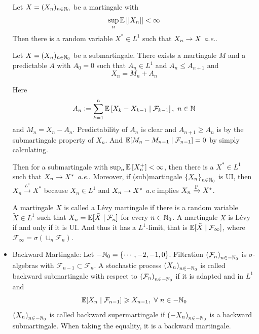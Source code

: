 \documentclass[a4paper,12pt]{article}
\begin{document}
\begin{itemize}
  \begin{thm}
    Let $X=(X_n)_{n\in \mathbb{N}_0}$ be a martingale with
    \begin{equation*}
      \sup_{n}\mathbb{E}\left[\left\lvert X_n\right\lvert\right] < \infty
    \end{equation*}
    Then there is a random variable $X^* \in L^1$ such that $X_n \rightarrow X$ \emph{a.e.}.
  \end{thm}

  \begin{prop}
    Let $X=(X_n)_{n\in \mathbb{N}_0}$ be a submartingale. There exists a martingale $M$ and a predictable $A$ with $A_0 = 0$ such that $A_n \in L^1$ and $A_n \leqslant A_{n+1}$ and
    \begin{equation*}
      X_n = M_n + A_n
    \end{equation*}
  \end{prop}
  Here
  \begin{equation*}
    A_n \vcentcolon= \sum_{k=1}^n\mathbb{E}\left[X_k - X_{k-1} \mid \mathcal{F}_{k-1}\right],~n\in \mathbb{N}
  \end{equation*}
  and $M_n = X_n - A_n$. Predictability of $A_n$ is clear and $A_{n+1} \geqslant A_n$ is by the submartingale property of $X_n$. And $\mathbb{E}[M_n - M_{n-1} \mid \mathcal{F}_{n-1}] = 0$ by simply calculating.

  \noindent Then for a submartingale with $\sup_{n}\mathbb{E}\left[X_n^+\right] < \infty$, then there is a $X^* \in L^1$ such that $X_n \rightarrow X^*$ \emph{a.e.}. Moreover, if (sub)martingale $\left\{{X}_n\right\}_{n\in \mathbb{N}_0}$ is UI, then $X_n \xrightarrow{L^1} X^*$ because $X_n \in L^1$ and $X_n \rightarrow X^*$ \emph{a.e} implies $X_n \xrightarrow{\mathbb{P}} X^*$. 

  \noindent A martingale $X$ is called a L\'evy martingale if there is a random variable $\tilde{X} \in L^1$ such that $X_n = \mathbb{E}[\tilde{X} \mid \mathcal{F}_n]$ for every $n \in \mathbb{N}_0$. A martingale $X$ is L\'evy if and only if it is UI. And thus it has a $L^1$-limit, that is $\mathbb{E}[\tilde{X} \mid \mathcal{F}_{\infty}]$, where $ \mathcal{F}_{\infty} = \sigma(\cup_n\mathcal{F}_n)$.

  \item Backward Martingale: Let $-\mathbb{N}_0 = \left\{\cdots,-2,-1,0\right\}$. Filtration $\left(\mathcal{F}_n\right)_{n\in -\mathbb{N}_0}$ is $\sigma$-algebras with $\mathcal{F}_{n-1} \subset \mathcal{F}_n$. A stochastic process $\left(X_n\right)_{n\in -\mathbb{N}_0}$ is called backward submartingale with respect to $\left(\mathcal{F}_n\right)_{n\in -\mathbb{N}_0}$ if it is adapted and in $L^1$ and
  \begin{equation*}
    \mathbb{E}[X_n \mid \mathcal{F}_{n-1}] \geqslant X_{n-1},~\forall~n\in -\mathbb{N}_0
  \end{equation*}
  $\left(X_n\right)_{n\in -\mathbb{N}_0}$ is called backward supermartingale if $\left(-X_n\right)_{n\in -\mathbb{N}_0}$ is a backward submartingale. When taking the equality, it is a backward martingale.


\end{itemize}
\end{document}
